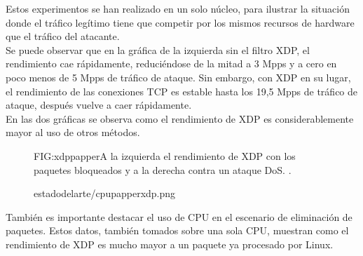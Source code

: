 Estos experimentos se han realizado en un solo núcleo, para ilustrar la situación donde el tráfico legítimo tiene que competir por los mismos recursos de hardware que el tráfico del atacante.
\\Se puede observar que en la gráfica de la izquierda sin el filtro XDP, el rendimiento cae rápidamente, reduciéndose de la mitad a 3 Mpps y a cero en poco menos de 5 Mpps de tráfico de ataque. Sin embargo, con XDP en su lugar, el rendimiento de las conexiones TCP es estable hasta los 19,5 Mpps de tráfico de ataque, después vuelve a caer rápidamente.
\\En las dos gráficas se observa como el rendimiento de XDP es considerablemente mayor al uso de otros métodos.

\begin{figure}[Rendimiento de XDP filtrando.]{FIG:xdppapper}{A la izquierda el rendimiento de XDP con los paquetes bloqueados y a la derecha contra un ataque DoS. \cite{xdppapper}.}
  \begin{image}{}{}{estadodelarte/cpupapperxdp.png}
  \end{image}
\end{figure}
También es importante destacar el uso de CPU en el escenario de eliminación de paquetes. Estos datos, también tomados sobre una sola CPU, muestran como el rendimiento de XDP es mucho mayor a un paquete ya procesado por Linux.